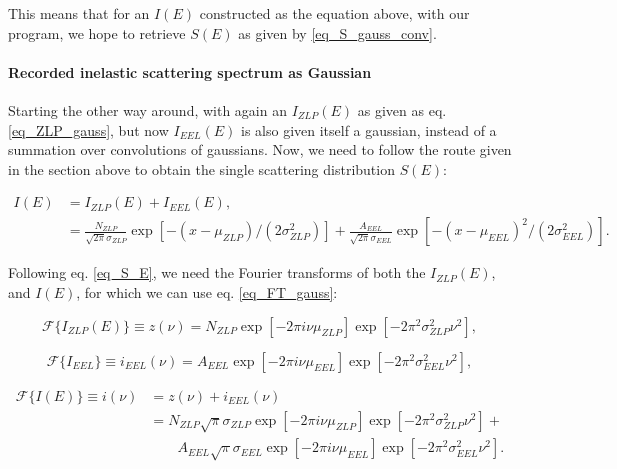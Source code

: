 This means that for an $I(E)$ constructed as the equation above, with our program, we hope to retrieve $S(E)$ as given by \eqref{eq_S_gauss_conv}.

















\paragraph{Recorded inelastic scattering spectrum as Gaussian}
Starting the other way around, with again an $I_{ZLP}(E)$ as given as eq. \eqref{eq_ZLP_gauss}, but now $I_{EEL}(E)$ is also given itself a gaussian, instead of a summation over convolutions of gaussians. Now, we need to follow the route given in the section above to obtain the single scattering distribution $S(E)$:

\begin{equation}
\begin{aligned}
I(E) &= I_{ZLP}(E) + I_{EEL}(E),\\
&= \frac{N_{ZLP}}{\sqrt{2\pi}\sigma_{ZLP}} \exp{[-(x-\mu_{ZLP})/(2\sigma_{ZLP}^2)]} +\frac{A_{EEL}}{\sqrt{2\pi}\sigma_{EEL}} \exp{[-(x-\mu_{EEL})^2/(2\sigma_{EEL}^2)]}.
\end{aligned}
\end{equation}

Following eq. \eqref{eq_S_E}, we need the Fourier transforms of both the $I_{ZLP}(E)$, and $I(E)$, for which we can use eq. \eqref{eq_FT_gauss}:

\begin{equation}\label{eq_i_nu_gauss}
    \mathcal{F}\{I_{ZLP}(E)\} \equiv z(\nu) = N_{ZLP}\exp{\left[-2 \pi i \nu \mu_{ZLP}\right]} \exp{\left[-2 \pi^{2} \sigma_{ZLP}^{2} \nu^{2}\right]},
\end{equation}

\begin{equation}\label{eq_i_EEL_gauss}
    \mathcal{F}\{I_{EEL}\} \equiv i_{EEL}(\nu) = A_{EEL} \exp{\left[-2 \pi i \nu \mu_{EEL}\right]} \exp{\left[-2 \pi^{2} \sigma_{EEL}^{2} \nu^{2}\right]},
\end{equation}

\begin{equation}
\begin{aligned}
\mathcal{F}\{I(E)\} \equiv i(\nu) &= z(\nu) + i_{EEL}(\nu) \\
&= N_{ZLP} \sqrt{\pi}\sigma_{ZLP} \exp{\left[-2 \pi i \nu \mu_{ZLP}\right]} \exp{\left[-2 \pi^{2} \sigma_{ZLP}^{2} \nu^{2}\right]} + \\
& \quad \quad A_{EEL} \sqrt{\pi}\sigma_{EEL} \exp{\left[-2 \pi i \nu \mu_{EEL}\right]} \exp{\left[-2 \pi^{2} \sigma_{EEL}^{2} \nu^{2}\right]}.
\end{aligned}
\end{equation}



